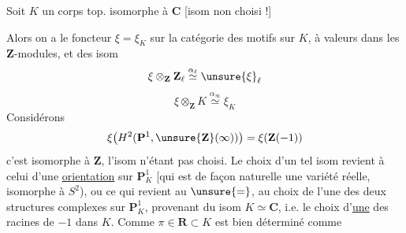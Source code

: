 Soit $K$ un corps top. isomorphe à $\mathbf C$ [isom non choisi !]

Alors on a le foncteur  $\xi=\xi_K$ sur la catégorie des motifs sur $K$, à valeurs dans les $\mathbf Z$-modules, et des isom
\[
 \xi\otimes_{\mathbf Z}\mathbf Z_\ell\overset{\alpha_\ell}{\simeq}\unsure{\xi}_\ell
\]
\[
 \xi\otimes_{\mathbf Z}K\overset{\alpha_\infty}{\simeq}\xi_K
\]
Considérons
\[
 \xi\bigl(H^2(\mathbf P^1,\unsure{\mathbf Z}(\infty))\bigr)=\xi(\mathbf Z(-1))
\]
c'est isomorphe à $\mathbf Z$, l'isom n'étant pas choisi. Le choix d'un tel isom  revient à celui d'une \uline{orientation} sur $\mathbf P_K^1$ [qui est de façon naturelle une variété  réelle, isomorphe à $S^2$), ou ce qui revient au $\unsure{=}$, au choix de l'une des deux structures complexes sur $\mathbf P_K^1$, provenant du  isom $K\simeq\mathbf C$, i.e. le choix d'\uline{une} des racines de $-1$ dans $K$. Comme $\pi\in\mathbf R\subset K$ est bien déterminé comme

